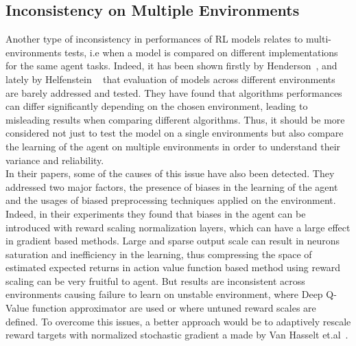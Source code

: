 \documentclass{article}
\begin{document}
\subsection{Inconsistency on Multiple Environments}
Another type of inconsistency in performances of RL models relates to multi-environments tests, i.e when a model is compared on different implementations for the same agent tasks. Indeed, it has been shown firstly by Henderson~\cite{DRL01}, and lately by Helfenstein ~\cite{BenchmarkingDRL} that evaluation of models across different environments are barely addressed and tested. 
They have found that algorithms performances can differ significantly depending on the chosen environment, leading to misleading results when comparing different algorithms. Thus, it should be more considered not just to test the model on a single environments but also compare the learning of the agent on multiple environments in order to understand their variance and reliability.\\
In their papers, some of the causes of this issue have also been detected. They addressed two major factors, the presence of biases in the learning of the agent and the usages of biased preprocessing techniques applied on the environment. Indeed, in their experiments they found that biases in the agent can be introduced with reward scaling normalization layers, which can have a large effect in gradient based methods. Large and sparse output scale can result in neurons saturation and inefficiency in the learning, thus compressing the space of estimated expected returns in action value function based method using reward scaling can be very fruitful to agent. But results are inconsistent across environments causing failure to learn on unstable environment, where Deep Q-Value function approximator are used or where untuned reward scales are defined. To overcome this issues, a better approach would be to adaptively rescale reward targets with normalized stochastic gradient a made by Van Hasselt et.al~\cite{VaHasselt}.
\end{document}
